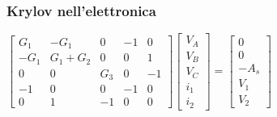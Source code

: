 \documentclass[10pt]{beamer}
\begin{document}
\begin{frame}\frametitle{Krylov nell'elettronica}


$\begin{bmatrix}
G_1 & -G_1 & 0 & -1 & 0 \\ -G_1 & G_1 + G_2 & 0 & 0 & 1 \\ 0 & 0 & G_3 & 0 & -1 \\ -1 & 0 & 0 & -1 & 0 \\ 0 & 1 & -1 & 0 & 0
\end{bmatrix} \begin{bmatrix}V_A \\ V_B \\ V_C\\ i_1 \\ i_2\end{bmatrix} = \begin{bmatrix} 0 \\ 0\\ -A_s\\ V_1 \\ V_2 \end{bmatrix}$



\end{frame}
\end{document}
